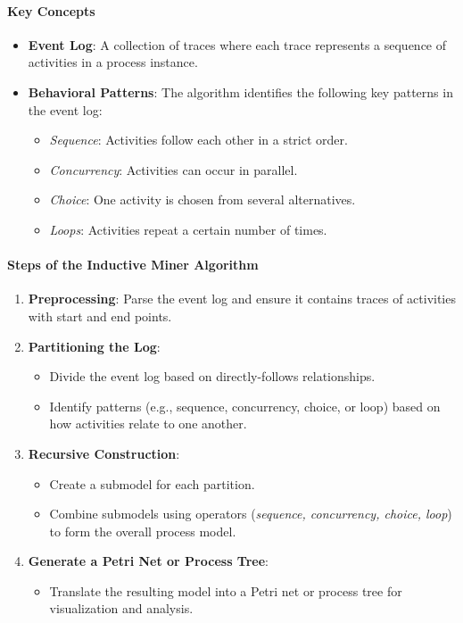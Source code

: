 \paragraph{Key Concepts}
\begin{itemize}
    \item \textbf{Event Log}: A collection of traces where each trace represents a sequence of activities in a process instance.
    \item \textbf{Behavioral Patterns}: The algorithm identifies the following key patterns in the event log:
    \begin{itemize}
        \item \textit{Sequence}: Activities follow each other in a strict order.
        \item \textit{Concurrency}: Activities can occur in parallel.
        \item \textit{Choice}: One activity is chosen from several alternatives.
        \item \textit{Loops}: Activities repeat a certain number of times.
    \end{itemize}
\end{itemize}

\paragraph{Steps of the Inductive Miner Algorithm}
\begin{enumerate}
    \item \textbf{Preprocessing}: Parse the event log and ensure it contains traces of activities with start and end points.
    \item \textbf{Partitioning the Log}:
    \begin{itemize}
        \item Divide the event log based on directly-follows relationships.
        \item Identify patterns (e.g., sequence, concurrency, choice, or loop) based on how activities relate to one another.
    \end{itemize}
    \item \textbf{Recursive Construction}:
    \begin{itemize}
        \item Create a submodel for each partition.
        \item Combine submodels using operators (\textit{sequence, concurrency, choice, loop}) to form the overall process model.
    \end{itemize}
    \item \textbf{Generate a Petri Net or Process Tree}:
    \begin{itemize}
        \item Translate the resulting model into a Petri net or process tree for visualization and analysis.
    \end{itemize}
\end{enumerate}


